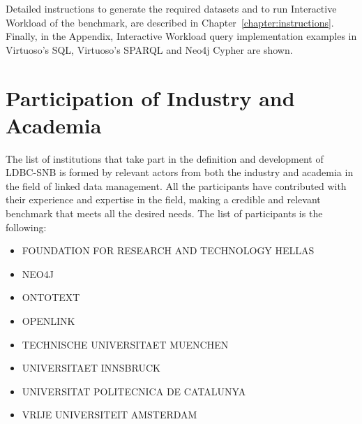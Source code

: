 %
%

Detailed instructions to generate the required datasets and to run Interactive
Workload of the benchmark, are described in Chapter~\ref{chapter:instructions}.
Finally, in the Appendix, Interactive Workload query implementation examples in
Virtuoso's SQL, Virtuoso's SPARQL and Neo4j Cypher are shown.


\section{Participation of Industry and Academia}

The list of institutions that take part in the definition and development
of LDBC-SNB is formed by relevant actors from both the industry and academia in
the field of linked data management. All the participants have contributed with
their experience and expertise in the field, making a credible and relevant
benchmark that meets all the desired needs. The list of participants is the
following:

\begin{itemize}
    \item FOUNDATION FOR RESEARCH AND TECHNOLOGY HELLAS
    \item NEO4J
    \item ONTOTEXT
    \item OPENLINK
    \item TECHNISCHE UNIVERSITAET MUENCHEN
    \item UNIVERSITAET INNSBRUCK
    \item UNIVERSITAT POLITECNICA DE CATALUNYA
    \item VRIJE UNIVERSITEIT AMSTERDAM
\end{itemize}

